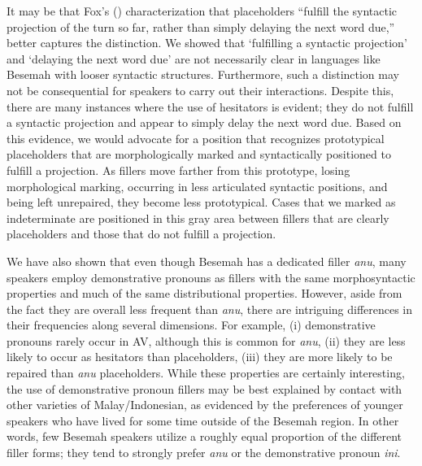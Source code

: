 \documentclass[output=paper,
\ChapterDOI{10.5281/zenodo.15697583}
colorlinks,
citecolor=brown]{langscibook}
\begin{document}
It may be that Fox's (\citeyear[2]{fox2010introduction}) characterization that placeholders ``fulfill the syntactic projection of the turn so far, rather than simply delaying the next word due,'' better captures the distinction. We showed that `fulfilling a syntactic projection' and `delaying the next word due' are not necessarily clear in languages like Besemah with looser syntactic structures. Furthermore, such a distinction may not be consequential for speakers to carry out their interactions. Despite this, there are many instances where the use of hesitators is evident; they do not fulfill a syntactic projection and appear to simply delay the next word due. Based on this evidence, we would advocate for a position that recognizes prototypical placeholders that are morphologically marked and syntactically positioned to fulfill a projection. As fillers move farther from this prototype, losing morphological marking, occurring in less articulated syntactic positions, and being left unrepaired, they become less prototypical. Cases that we marked as indeterminate are positioned in this gray area between fillers that are clearly placeholders and those that do not fulfill a projection.

We have also shown that even though Besemah has a dedicated filler \textit{anu}, many speakers employ demonstrative pronouns as fillers with the same morphosyntactic properties and much of the same distributional properties. However, aside from the fact they are overall less frequent than \textit{anu}, there are intriguing differences in their frequencies along several dimensions. For example, (i) demonstrative pronouns rarely occur in AV, although this is common for \textit{anu}, (ii) they are less likely to occur as hesitators than placeholders, (iii) they are more likely to be repaired than \textit{anu} placeholders. While these properties are certainly interesting, the use of demonstrative pronoun fillers may be best explained by contact with other varieties of Malay/Indonesian, as evidenced by the preferences of younger speakers who have lived for some time outside of the Besemah region. In other words, few Besemah speakers utilize a roughly equal proportion of the different filler forms; they tend to strongly prefer \textit{anu} or the demonstrative pronoun \textit{ini}. 
\end{document}
